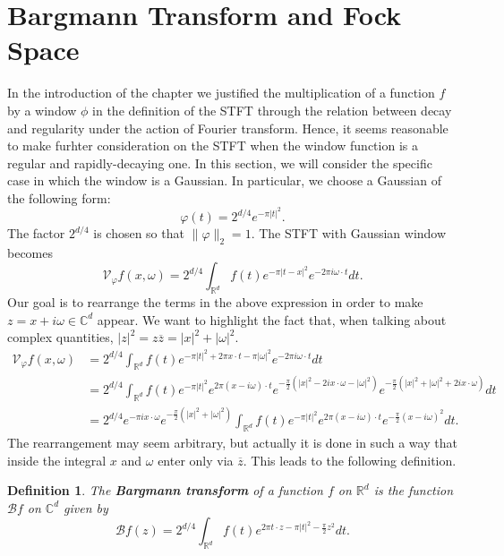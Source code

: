 \documentclass[corpo=11pt, stile=classica, tipotesi=custom,
greek, evenboxes, english]{toptesi}
\numberwithin{equation}{chapter}
\newtheorem{defi}[teo]{Definition}
\theoremstyle{definition}
\theoremstyle{remark}
\newcommand{\R}{\mathbb{R}} %
\newcommand{\V}{\mathcal{V}} %
\newcommand{\C}{\mathbb{C}} %
\newcommand{\Barg}{\mathcal{B}} %
\begin{document}
\section{Bargmann Transform and Fock Space}\label{section Fock Space and Bargmann transform}
In the introduction of the chapter we justified the multiplication of a function $f$ by a window $\phi$ in the definition of the STFT through the relation between decay and regularity under the action of Fourier transform. Hence, it seems reasonable to make furhter consideration on the STFT when the window function is a regular and rapidly-decaying one. In this section, we will consider the specific case in which the window is a Gaussian. In particular, we choose a Gaussian of the following form:
\begin{equation}\label{gaussian normalized}
	\varphi(t) = 2^{d/4} e^{-\pi |t|^2}.
\end{equation}
The factor $2^{d/4}$ is chosen so that $\|\varphi\|_2=1$. The STFT with Gaussian window becomes
\begin{equation}
	\V_{\varphi}f(x,\omega) = 2^{d/4} \int_{\R^d} f(t) e^{-\pi |t-x|^2} e^{-2 \pi i \omega \cdot t} dt.
\end{equation}
Our goal is to rearrange the terms in the above expression in order to make $z=x+i\omega \in \C^d$ appear. We want to highlight the fact that, when talking about complex quantities, $|z|^2 = z \overline{z} = |x|^2 + |\omega|^2$.
\begin{align*}
	\V_{\varphi}f(x,\omega) &= 2^{d/4} \int_{\R^d} f(t) e^{-\pi |t|^2 + 2 \pi x \cdot t - \pi |\omega|^2} e^{ - 2 \pi i \omega \cdot t} dt\\
							&= 2^{d/4} \int_{\R^d} f(t) e^{-\pi |t|^2} e^{2 \pi (x - i \omega) \cdot t} e^{-\frac{\pi}{2}\left(|x|^2 - 2 i x \cdot \omega - |\omega|^2\right)} e^{-\frac{\pi}{2}\left(|x|^2 + |\omega|^2 + 2 i x \cdot \omega\right)}dt\\
							&= 2^{d/4} e^{-\pi i x \cdot \omega} e^{-\frac{\pi}{2}\left(|x|^2 + |\omega|^2\right)} \int_{\R^d} f(t) e^{-\pi |t|^2} e^{2 \pi (x-i\omega) \cdot t}e^{-\frac{\pi}{2}(x-i\omega)^2}dt.
\end{align*}
The rearrangement may seem arbitrary, but actually it is done in such a way that inside the integral $x$ and $\omega$ enter only via $\overline{z}$. This leads to the following definition.
\begin{defi}\label{Bargmann transform}
	The \textbf{Bargmann transform} of a function $f$ on $\R^d$ is the function $\Barg f$ on $\C^d$ given by
	\begin{equation}\label{Bargmann transform formula}
		\Barg f(z) = 2^{d/4} \int_{\R^d} f(t) e^{2 \pi t \cdot z - \pi |t|^2 - \frac{\pi}{2}z^2}dt.
	\end{equation}
\end{defi}
\end{document}
